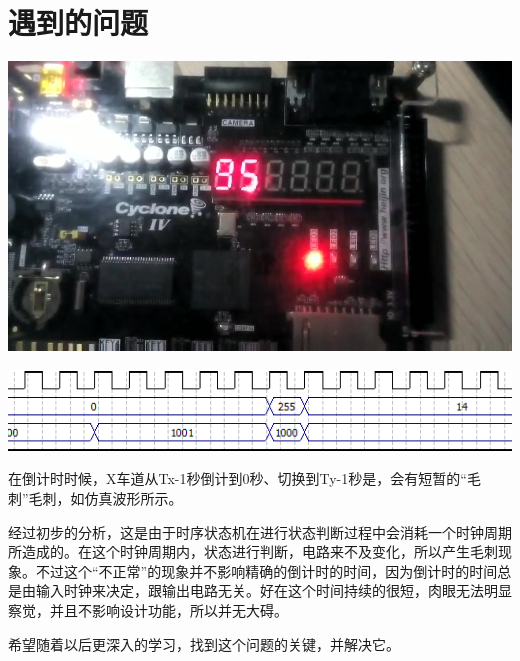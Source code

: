 \documentclass[12pt,a4paper]{article}
\begin{document}
\section{遇到的问题}
\begin{center}
\includegraphics[width=15cm]{pic/test/17}
\vspace*{0.25cm}

\includegraphics[width=16cm]{pic/problems}
\end{center}

在倒计时时候，X车道从Tx-1秒倒计到0秒、切换到Ty-1秒是，会有短暂的“毛刺”毛刺，如仿真波形所示。

经过初步的分析，这是由于时序状态机在进行状态判断过程中会消耗一个时钟周期所造成的。在这个时钟周期内，状态进行判断，电路来不及变化，所以产生毛刺现象。不过这个“不正常”的现象并不影响精确的倒计时的时间，因为倒计时的时间总是由输入时钟来决定，跟输出电路无关。好在这个时间持续的很短，肉眼无法明显察觉，并且不影响设计功能，所以并无大碍。

希望随着以后更深入的学习，找到这个问题的关键，并解决它。
\end{document}
